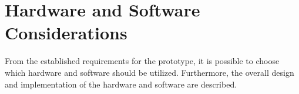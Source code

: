 \chapter{Hardware and Software\\ Considerations}
From the established requirements for the prototype, it is possible to choose which hardware and software should be utilized. Furthermore, the overall design and implementation of the hardware and software are described.